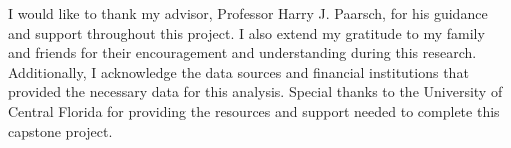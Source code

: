 I would like to thank my advisor, Professor Harry J. Paarsch, for his guidance and support throughout this project. I also extend my gratitude to my family and friends for their encouragement and understanding during this research. Additionally, I acknowledge the data sources and financial institutions that provided the necessary data for this analysis. Special thanks to the University of Central Florida for providing the resources and support needed to complete this capstone project.

